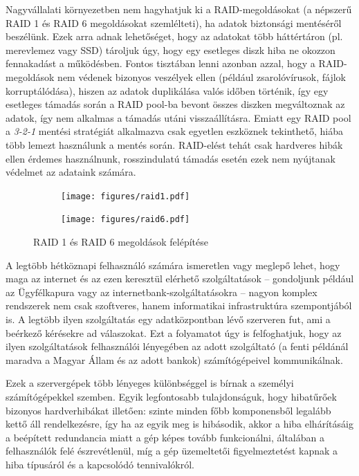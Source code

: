 Nagyvállalati környezetben nem hagyhatjuk ki a RAID-megoldásokat (a népszerű RAID 1 és RAID 6 megoldásokat  szemlélteti), ha adatok biztonsági mentéséről beszélünk. Ezek arra adnak lehetőséget, hogy az adatokat több háttértáron (pl. merevlemez vagy SSD) tároljuk úgy, hogy egy esetleges diszk hiba ne okozzon fennakadást a működésben. Fontos tisztában lenni azonban azzal, hogy a RAID-megoldások nem védenek bizonyos veszélyek ellen (például zsarolóvírusok, fájlok korruptálódása), hiszen az adatok duplikálása valós időben történik, így egy esetleges támadás során a RAID pool-ba bevont összes diszken megváltoznak az adatok, így nem alkalmas a támadás utáni visszaállításra. Emiatt egy RAID pool a \textit{3-2-1} mentési stratégiát alkalmazva csak egyetlen eszköznek tekinthető, hiába több lemezt használunk a mentés során. RAID-elést tehát csak hardveres hibák ellen érdemes használnunk, rosszindulatú támadás esetén ezek nem nyújtanak védelmet az adataink számára.

\begin{figure}[!ht]
	
	\centering
	\begin{subfigure}{0.3\textwidth}
		\centering
		\texttt{[image: figures/raid1.pdf]}
	\end{subfigure}
	\hspace{0.05\textwidth}
	\begin{subfigure}{0.6\textwidth}
		\centering
		\texttt{[image: figures/raid6.pdf]}
	\end{subfigure}
	\caption{RAID 1 és RAID 6 megoldások felépítése \cite{WikiRaidLevels}}
	\label{fig:raid}
\end{figure}

A legtöbb hétköznapi felhasználó számára ismeretlen vagy meglepő lehet, hogy maga az internet és az ezen keresztül elérhető szolgáltatások -- gondoljunk például az Ügyfélkapura vagy az internetbank-szolgáltatásokra -- nagyon komplex rendszerek nem csak szoftveres, hanem informatikai infrastruktúra szempontjából is. A legtöbb ilyen szolgáltatás egy adatközpontban lévő szerveren fut, ami a beérkező kérésekre ad válaszokat. Ezt a folyamatot úgy is felfoghatjuk, hogy az ilyen szolgáltatások felhasználói lényegében az adott szolgáltató (a fenti példánál maradva a Magyar Állam és az adott bankok) számítógépeivel kommunikálnak.

Ezek a szervergépek több lényeges különbséggel is bírnak a személyi számítógépekkel szemben. Egyik legfontosabb tulajdonságuk, hogy hibatűrőek bizonyos hardverhibákat illetően: szinte minden főbb komponensből legalább kettő áll rendelkezésre, így ha az egyik meg is hibásodik, akkor a hiba elhárításáig a beépített redundancia miatt a gép képes tovább funkcionálni, általában a felhasználók felé észrevétlenül, míg a gép üzemeltetői figyelmeztetést kapnak a hiba típusáról és a kapcsolódó tennivalókról.

